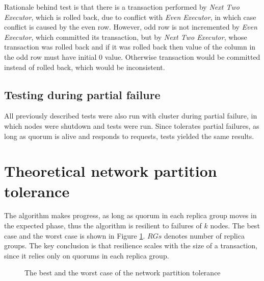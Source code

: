 Rationale behind test is that there is a transaction performed by \emph{Next Two Executor}, which is rolled back, due to conflict with \emph{Even Executor}, in which case conflict is caused by the even row. However, odd row is not incremented by \emph{Even Executor}, which committed its transaction, but by \emph{Next Two Executor}, whose transaction was rolled back and if it was rolled back then value of the column in the odd row must have initial $0$ value.  Otherwise transaction would be committed instead of rolled back, which would be inconsistent.


\subsection{Testing during partial failure}

All previously described tests were also run with cluster during partial failure, in which nodes were shutdown and tests were run. Since \mpt tolerates partial failures, as long as quorum is alive and responds to requests, tests yielded the same results.

\section{Theoretical network partition tolerance}
The algorithm makes progress, as long as quorum in each replica group moves in the expected phase, thus the algorithm is resilient to failures of $k$ nodes. The best case and the worst case is shown in Figure \ref{fig:tests:networkPartitionTolerance}. $RGs$ denotes number of replica groups. The key conclusion is that resilience scales with the size of a transaction, since it relies only on quorums in each replica group.

\begin{figure}[hbt]
  \setlength{\unitlength}{1.3cm}  
  \caption{The best and the worst case of the network partition tolerance}
  \label{fig:tests:networkPartitionTolerance}
\end{figure}

